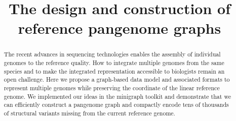 \documentclass[twocolumn]{bmcart}%
\begin{document}
\begin{frontmatter}

\begin{fmbox}

\title{The design and construction of reference pangenome graphs}

\author[
   addressref={aff1,aff2},          %
   corref={aff1,aff2},              %
   email={hli@ds.dfci.harvard.edu}  %
]{ }
\author[
   addressref={aff1,aff2},
]{ }
\author[
   addressref={aff2},
]{ }

\address[id=aff1]{%
  , %
  ,                    %
}
\address[id=aff2]{%
  ,
  ,
}

\begin{abstractbox}

\begin{abstract} %
The recent advances in sequencing technologies enables the assembly of
individual genomes to the reference quality. How to integrate multiple genomes
from the same species and to make the integrated representation accessible to
biologists remain an open challenge. Here we propose a graph-based data model
and associated formats to represent multiple genomes while preserving the
coordinate of the linear reference genome. We implemented our ideas in the
minigraph toolkit and demonstrate that we can efficiently construct a pangenome
graph and compactly encode tens of thousands of structural variants missing
from the current reference genome.
\end{abstract}

\begin{keyword}
\end{keyword}

\end{abstractbox}

\end{fmbox}

\end{frontmatter}
\end{document}
